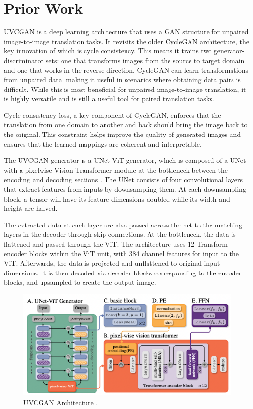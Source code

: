 \documentclass[10pt,twocolumn]{article}
\begin{document}
\section{Prior Work}

UVCGAN is a deep learning architecture that uses a GAN structure for unpaired image-to-image translation tasks. It revisits the older CycleGAN architecture, the key innovation of which is cycle consistency. This means it trains two generator-discriminator sets: one that transforms images from the source to target domain and one that works in the reverse direction. CycleGAN can learn transformations from unpaired data, making it useful in scenarios where obtaining data pairs is difficult. While this is most beneficial for unpaired image-to-image translation, it is highly versatile and is still a useful tool for paired translation tasks. 

Cycle-consistency loss, a key component of CycleGAN, enforces that the translation from one domain to another and back should bring the image back to the original. This constraint helps improve the quality of generated images and ensures that the learned mappings are coherent and interpretable. \cite{uvcgan}

The UVCGAN generator is a UNet-ViT generator, which is composed of a UNet \cite{unet} with a pixelwise Vision Transformer module at the bottleneck between the encoding and decoding sections \cite{uvcgan}. The UNet consists of four convolutional layers that extract features from inputs by downsampling them. At each downsampling block, a tensor will have its feature dimensions doubled while its width and height are halved. 

The extracted data at each layer are also passed across the net to the matching layers in the decoder through skip connections. At the bottleneck, the data is flattened and passed through the ViT. The architecture uses 12 Transform encoder blocks within the ViT unit, with 384 channel features for input to the ViT. Afterwards, the data is projected and unflattened to original input dimensions. It is then decoded via decoder blocks corresponding to the encoder blocks, and upsampled to create the output image.

\begin{figure}[h]
	\centering
        \includegraphics[scale=0.46]{uvcgan}
	\caption{UVCGAN Architecture \cite{uvcgan}.}
	\label{fig:uvcgan}
\end{figure}
\end{document}
